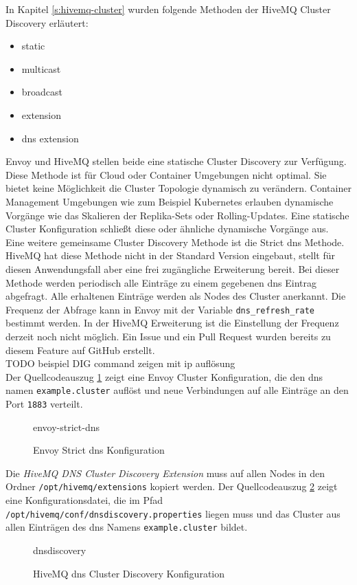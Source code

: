 \cite{ServiceDiscoveryEnvoy}
In Kapitel \ref{s:hivemq-cluster} wurden folgende Methoden der HiveMQ Cluster Discovery erläutert:
\begin{itemize}
  \item static
  \item multicast
  \item broadcast
  \item extension
  \item dns extension
\end{itemize}
Envoy und HiveMQ stellen beide eine statische Cluster Discovery zur Verfügung. Diese Methode ist für Cloud oder Container Umgebungen nicht optimal. Sie bietet keine Möglichkeit die Cluster Topologie dynamisch zu verändern. Container Management Umgebungen wie zum Beispiel Kubernetes erlauben dynamische Vorgänge wie das Skalieren der Replika-Sets oder Rolling-Updates. Eine statische Cluster Konfiguration schlie{\ss}t diese oder ähnliche dynamische Vorgänge aus.\\
Eine weitere gemeinsame Cluster Discovery Methode ist die Strict \ac{dns} Methode. HiveMQ hat diese Methode nicht in der Standard Version eingebaut, stellt für diesen Anwendungsfall aber eine frei zugängliche Erweiterung bereit.
Bei dieser Methode werden periodisch alle Einträge zu einem gegebenen \ac{dns} Eintrag abgefragt. Alle erhaltenen Einträge werden als Nodes des Cluster anerkannt. Die Frequenz der Abfrage kann in Envoy mit der Variable \verb|dns_refresh_rate| bestimmt werden. In der HiveMQ Erweiterung ist die Einstellung der Frequenz derzeit noch nicht möglich. Ein Issue \cite{AllowConfigurationDiscovery} und ein Pull Request \cite{ExponentialBackoffGeneral} wurden bereits zu diesem Feature auf GitHub erstellt.
\\
TODO beispiel DIG command zeigen mit ip auflösung
\\
Der Quellcodeauszug \ref{code:envoy-strict-dns} zeigt eine Envoy Cluster Konfiguration, die den \ac{dns} namen \verb|example.cluster| auflöst und neue Verbindungen auf alle Einträge an den Port \verb|1883| verteilt.
\begin{figure}
    {envoy-strict-dns}
    \caption{Envoy Strict \ac{dns} Konfiguration}
    \label{code:envoy-strict-dns}
\end{figure}
Die \textit{HiveMQ DNS Cluster Discovery Extension} \cite{HiveMQExtensionDNS} muss auf allen Nodes in den Ordner \verb|/opt/hivemq/extensions| kopiert werden. Der Quellcodeauszug \ref{code:hivemq-dnsdiscovery} zeigt eine Konfigurationsdatei, die im Pfad \verb|/opt/hivemq/conf/dnsdiscovery.properties| liegen muss und das Cluster aus allen Einträgen des \ac{dns} Namens \verb|example.cluster| bildet.
\begin{figure}
    {dnsdiscovery}
    \caption{HiveMQ \ac{dns} Cluster Discovery Konfiguration}
    \label{code:hivemq-dnsdiscovery}
\end{figure}

